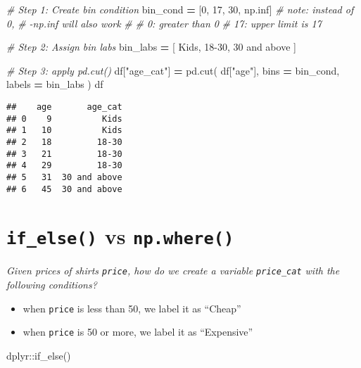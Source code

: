 \documentclass[
]{book}
\newenvironment{Shaded}{\begin{snugshade}}{\end{snugshade}}
\newcommand{\CommentTok}[1]{\textcolor[rgb]{0.56,0.35,0.01}{\textit{#1}}}
\newcommand{\DecValTok}[1]{\textcolor[rgb]{0.00,0.00,0.81}{#1}}
\newcommand{\NormalTok}[1]{#1}
\newcommand{\OperatorTok}[1]{\textcolor[rgb]{0.81,0.36,0.00}{\textbf{#1}}}
\newcommand{\StringTok}[1]{\textcolor[rgb]{0.31,0.60,0.02}{#1}}
\begin{document}
\begin{Shaded}
\begin{Highlighting}[]
\CommentTok{\# Step 1: Create bin condition}
\NormalTok{bin\_cond }\OperatorTok{=}\NormalTok{ [}\DecValTok{0}\NormalTok{, }\DecValTok{17}\NormalTok{, }\DecValTok{30}\NormalTok{, np.inf] }
\CommentTok{\# note: instead of 0, }
\CommentTok{\#       {-}np.inf will also work}
\CommentTok{\#  }
\CommentTok{\# 0: greater than 0}
\CommentTok{\# 17: upper limit is 17}

\CommentTok{\# Step 2: Assign bin labs}
\NormalTok{bin\_labs }\OperatorTok{=}\NormalTok{ [}
  \StringTok{\textquotesingle{}Kids\textquotesingle{}}\NormalTok{,}
  \StringTok{\textquotesingle{}18{-}30\textquotesingle{}}\NormalTok{,}
  \StringTok{\textquotesingle{}30 and above\textquotesingle{}}
\NormalTok{]}

\CommentTok{\# Step 3: apply pd.cut() }
\NormalTok{df[}\StringTok{"age\_cat"}\NormalTok{] }\OperatorTok{=}\NormalTok{ pd.cut(}
\NormalTok{  df[}\StringTok{"age"}\NormalTok{],}
\NormalTok{  bins }\OperatorTok{=}\NormalTok{ bin\_cond,}
\NormalTok{  labels }\OperatorTok{=}\NormalTok{ bin\_labs}
\NormalTok{)}
\NormalTok{df}
\end{Highlighting}
\end{Shaded}

\begin{verbatim}
##    age       age_cat
## 0    9          Kids
## 1   10          Kids
## 2   18         18-30
## 3   21         18-30
## 4   29         18-30
## 5   31  30 and above
## 6   45  30 and above
\end{verbatim}

\hypertarget{if_else-vs-np.where}{%
\section{\texorpdfstring{\texttt{if\_else()} vs \texttt{np.where()}}{if\_else() vs np.where()}}\label{if_else-vs-np.where}}

\emph{Given prices of shirts \texttt{price}, how do we create a variable \texttt{price\_cat} with the following conditions?}

\begin{itemize}
\item
  when \texttt{price} is less than 50, we label it as ``Cheap''
\item
  when \texttt{price} is 50 or more, we label it as ``Expensive''
\end{itemize}

dplyr::if\_else()
\end{document}
